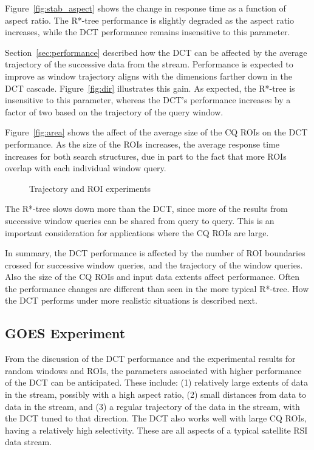 \documentclass{ucdthesis}       %
\begin{document}
Figure~\ref{fig:stab_aspect}
shows the change in response time as a function of aspect ratio.  The
R*-tree performance is slightly degraded as the aspect ratio
increases, while the \ac{DCT} performance remains insensitive to this
parameter.


Section~\ref{sec:performance} described how the \ac{DCT} can be affected
by the average trajectory of the successive data from the stream.
Performance is expected to improve as window trajectory aligns with
the dimensions farther down in the \ac{DCT} cascade.
Figure~\ref{fig:dir} illustrates this gain.  As expected, the R*-tree
is insensitive to this parameter, whereas the \ac{DCT}'s performance
increases by a factor of two based on the trajectory of the query
window.

Figure~\ref{fig:area} shows the affect of the average size of the
\ac{CQ} \acp{ROI} on the \ac{DCT} performance.  As the size of the \acp{ROI}
increases, the average response time increases for both search
structures, due in part to the fact that more \acp{ROI} overlap with
each individual window query.

\begin{figure}[htb]
    \caption{Trajectory and \ac{ROI} experiments}
\end{figure}

The R*-tree slows down more than the \ac{DCT}, since more of the results
from successive window queries can be shared from query to query.
This is an important consideration for applications where the \ac{CQ}
\acp{ROI} are large.

In summary, the \ac{DCT} performance is affected by the number of \ac{ROI}
boundaries crossed for successive window queries, and the trajectory
of the window queries. Also the size of the \ac{CQ} \acp{ROI} and input
data extents affect performance.  Often the performance changes are
different than seen in the more typical R*-tree.  How the \ac{DCT}
performs under more realistic situations is described next.

\subsection{GOES Experiment}
\label{sec:goesex}

From the discussion of the \ac{DCT} performance and the experimental
results for random windows and \acp{ROI}, the parameters associated with
higher performance of the \ac{DCT} can be anticipated.  These include:
(1) relatively large extents of data in the stream, possibly with a
high aspect ratio, (2) small distances from data to data in the
stream, and (3) a regular trajectory of the data in the stream, with
the \ac{DCT} tuned to that direction.  The \ac{DCT} also works well with
large \ac{CQ} \acp{ROI}, having a relatively high selectivity.  These
are all aspects of a typical satellite \ac{RSI} data stream.
\end{document}
